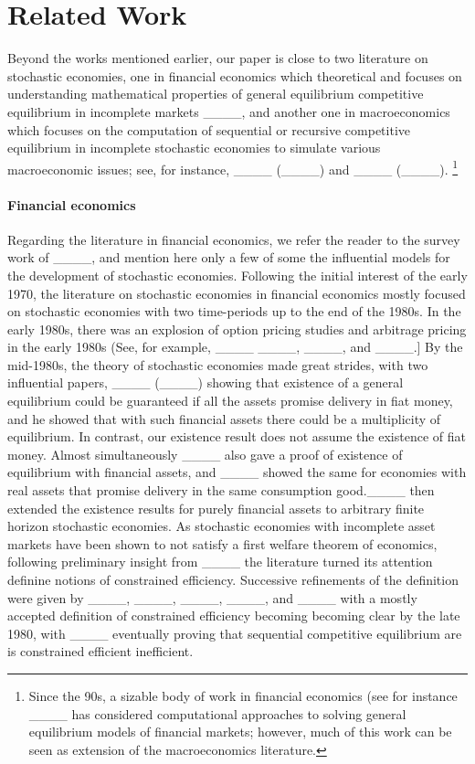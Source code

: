 \section{Related Work}
\label{sec:related}

Beyond the works mentioned earlier, our paper is close to two literature on stochastic economies, one in financial economics which theoretical and focuses on understanding mathematical properties of general equilibrium competitive equilibrium in incomplete markets ____, and another one in macroeconomics which focuses on the computation of sequential or recursive competitive equilibrium in incomplete stochastic economies to simulate various macroeconomic issues; see, for instance, ____ (____) and ____ (____).%
\footnote{Since the 90s, a sizable body of work in financial economics (see for instance ____ has considered computational approaches to solving general equilibrium models of financial markets; however, much of this work can be seen as extension of the macroeconomics literature.} 

\paragraph{Financial economics}
Regarding the literature in financial economics, we refer the reader to the survey work of ____, and mention here only a few of some the influential models for the development of stochastic economies. Following the initial interest of the early 1970, the literature on stochastic economies in financial economics mostly focused on stochastic economies with two time-periods up to the end of the 1980s. In the early 1980s, there was an explosion of option pricing studies and arbitrage pricing in the early 1980s (See, for
example, ____  ____, ____, and ____.] 
By the mid-1980s, the theory of stochastic economies made great strides, with two influential papers, ____ (____) showing that existence of a general equilibrium could be guaranteed if all the assets promise delivery
in fiat money, and he showed that with such financial assets there could be a multiplicity of equilibrium. In contrast, our existence result does not assume the existence of fiat money. Almost simultaneously ____ also gave a proof of existence of equilibrium with financial assets, and ____ showed the same for economies with real assets that promise delivery in the same consumption good.____ then extended the existence results for purely financial assets to arbitrary finite horizon stochastic economies. As stochastic economies with incomplete asset markets have been shown to not satisfy a first welfare theorem of economics, following preliminary insight from ____ the literature turned its attention definine notions of constrained efficiency. Successive refinements of the definition were given by ____, ____, ____, ____, and ____ with a mostly accepted definition of constrained efficiency becoming becoming clear by the late 1980, with ____ eventually proving that sequential competitive equilibrium are is constrained efficient inefficient.
 


